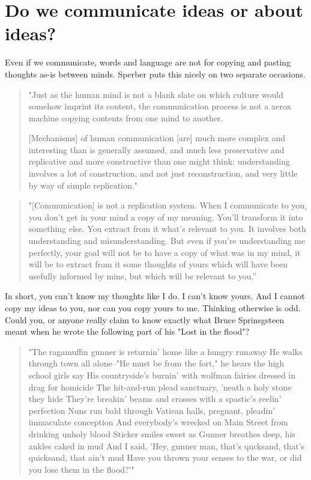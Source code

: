 \section{Do we communicate ideas or about ideas?}
\label{c1-s7}
Even if we communicate, words and language are not for copying and pasting thoughts as-is between minds. Sperber puts this nicely on two separate occasions.

\begin{quote}
"Just as the human mind is not a blank slate on which culture would somehow imprint its content, the communication process is not a xerox machine copying contents from one mind to another. 

[Mechanisms] of human communication [are] much more complex and interesting than is generally assumed, and much less preservative and replicative and more constructive than one might think: understanding involves a lot of construction, and not just reconstruction, and very little by way of simple replication." \cite{Sperber2005}
\end{quote}

\begin{quote}"[Communication] is not a replication system. When I communicate to you, you don’t get in your mind a copy of my meaning. You’ll transform it into something else. You extract from it what’s relevant to you. It involves both understanding and misunderstanding. But even if you’re understanding me perfectly, your goal will not be to have a copy of what was in my mind, it will be to extract from it some thoughts of yours which will have been usefully informed by mine, but which will be relevant to you.'' \cite{Sperber2017}
\end{quote}

In short, you can't know my thoughts like I do. I can't know yours. And I cannot copy my ideas to you, nor can you copy yours to me. Thinking otherwise is odd. Could you, or anyone really claim to know exactly what Bruce Sprinsgsteen meant when he wrote the following part of his "Lost in the flood"?

\begin{quote}
"The ragamuffin gunner is returnin' home like a hungry runaway
He walks through town all alone--"He must be from the fort," he hears the high school girls say
His countryside's burnin' with wolfman fairies dressed in drag for homicide
The hit-and-run plead sanctuary, 'neath a holy stone they hide
They're breakin' beams and crosses with a spastic's reelin' perfection
Nuns run bald through Vatican halls, pregnant, pleadin' immaculate conception
And everybody's wrecked on Main Street from drinking unholy blood
Sticker smiles sweet as Gunner breathes deep, his ankles caked in mud
And I said, 'Hey, gunner man, that's qucksand, that's quicksand, that ain't mud
Have you thrown your senses to the war, or did you lose them in the flood?'" \cite{wikipedia-lost-in-the-flood}
\end{quote}

